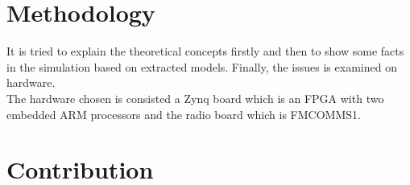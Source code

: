\section{Methodology}
It is tried to explain the theoretical concepts firstly and then to show some facts in the simulation based on extracted models. Finally, the issues is examined on hardware.\\
The hardware chosen is consisted a Zynq board which is an FPGA with two embedded ARM processors and the radio board which is FMCOMMS1.

\section{Contribution}

